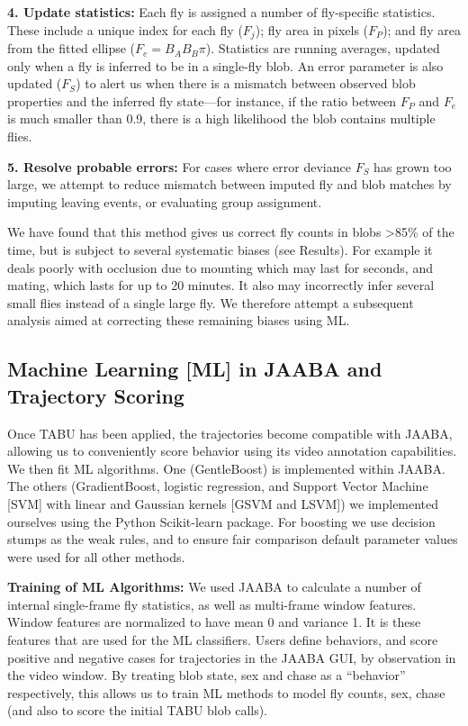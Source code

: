 \documentclass[11pt]{article}
\begin{document}
{ \textbf{4. Update statistics:} Each fly is assigned a number of fly-specific statistics. These include a unique index for each fly ($F_j$); fly area in pixels ($F_P$); and fly area from the fitted ellipse ($F_e= {B_A B_B \pi}$). Statistics are running averages, updated only when a fly is inferred to be in a single-fly blob. An error parameter is also updated ($F_S$) to alert us when there is a mismatch between observed blob properties and the inferred fly state---for instance, if the ratio between $F_P$ and $F_e$ is much smaller than 0.9, there is a high likelihood the blob contains multiple flies. 

 \textbf{5. Resolve probable errors:} For cases where error deviance $F_S$ has grown too large, we attempt to reduce mismatch between imputed fly and blob matches by imputing leaving events, or evaluating group assignment.


\vspace*{0.05in}
We have found that this method gives us correct fly counts in blobs \textgreater85\% of the time, but is subject to several systematic biases (see Results). For example it deals poorly with occlusion due to mounting which may last for seconds, and mating, which lasts for up to 20 minutes. It also may incorrectly infer several small flies instead of a single large fly. 
We therefore attempt a subsequent analysis aimed at correcting these remaining biases using ML.

\vspace*{-0.15in}
\subsection*{Machine Learning [ML] in JAABA and Trajectory Scoring}
\vspace*{-0.12in}
Once TABU has been applied, the trajectories become compatible with JAABA, allowing us to conveniently score behavior using its video annotation capabilities. 
We then fit ML algorithms. One (GentleBoost) is implemented within JAABA. The others (GradientBoost, logistic regression, and Support Vector Machine [SVM] with linear and Gaussian kernels [GSVM and LSVM]) we implemented ourselves using the Python Scikit-learn \cite{scikit} package. For boosting we use decision stumps as the weak rules, and to ensure fair comparison default parameter values were used for all other methods. 


\textbf{Training of ML Algorithms:} 
We used JAABA to calculate a number of internal single-frame fly statistics, as well as multi-frame window features. Window features are normalized to have mean 0 and variance 1. It is these features that are used for the ML classifiers. Users define behaviors, and score positive and negative cases for trajectories in the JAABA GUI, by observation in the video window. By treating blob state, sex and chase as a ``behavior'' respectively, this allows us to train ML methods to model fly counts, sex, chase (and also to score the initial TABU blob calls). 

}
\end{document}
